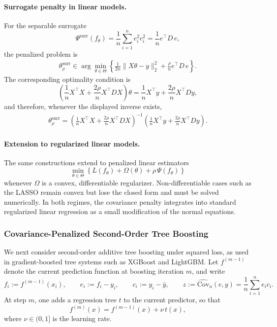 \documentclass[12pt]{article}
\theoremstyle{plain}
\theoremstyle{definition}
\newcommand{\1}{\mathbf{1}}
\newcommand{\Cov}{\text{Cov}}
\begin{document}
\paragraph{Surrogate penalty in linear models.}
For the separable surrogate
\[
\Psi^{\mathrm{surr}}(f_\theta)
=
\frac{1}{n}\sum_{i=1}^n e_i^2 c_i^2
=
\frac{1}{n}e^\top D\,e,
\]
the penalized problem is
\begin{align}
    \label{opt:linear_surr}
    \theta_{\rho}^{\mathrm{surr}}
    \in
    \arg\min_{\theta\in\Theta}
    \left\{
        \frac{1}{2n}\|X\theta-y\|_2^2
        +
        \frac{\rho}{n}e^\top D\,e
    \right\}.
\end{align}
The corresponding optimality condition is
\[
\left(
\frac{1}{n}X^\top X
+
\frac{2\rho}{n}X^\top D X
\right)\theta
=
\frac{1}{n}X^\top y
+
\frac{2\rho}{n}X^\top D y,
\]
and therefore, whenever the displayed inverse exists,
\begin{align}
    \label{eq:linear_surr_closed_form}
    \theta_{\rho}^{\mathrm{surr}}
    =
    \left(
        \frac{1}{n}X^\top X
        +
        \frac{2\rho}{n}X^\top D X
    \right)^{-1}
    \left(
        \frac{1}{n}X^\top y
        +
        \frac{2\rho}{n}X^\top D y
    \right).
\end{align}

\paragraph{Extension to regularized linear models.}
The same constructions extend to penalized linear estimators
\[
\min_{\theta\in\Theta}
\left\{
    L(f_\theta) + \Omega(\theta) + \rho\,\Psi(f_\theta)
\right\}
\]
whenever $\Omega$ is a convex, differentiable regularizer. Non-differentiable cases such as the LASSO remain convex but lose the closed form and must be solved numerically. In both regimes, the covariance penalty integrates into standard regularized linear regression as a small modification of the normal equations.

\subsubsection{Covariance-Penalized Second-Order Tree Boosting}
\label{subsec:tree_boosting}

We next consider second-order additive tree boosting under squared loss, as used in gradient-boosted tree systems such as XGBoost and LightGBM. Let \(f^{(m-1)}\) denote the current prediction function at boosting iteration \(m\), and write
\[
f_i := f^{(m-1)}(x_i),
\qquad
e_i := f_i - y_i,
\qquad
c_i := y_i - \bar y,
\qquad
z := \widehat{\Cov}_n(e,y) = \frac{1}{n}\sum_{i=1}^n e_i c_i.
\]
At step \(m\), one adds a regression tree \(t\) to the current predictor, so that
\[
f^{(m)}(x) = f^{(m-1)}(x) + \nu\,t(x),
\]
where \(\nu\in(0,1]\) is the learning rate.
\end{document}
